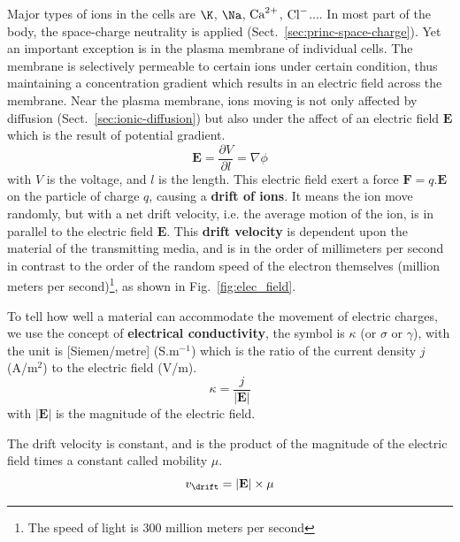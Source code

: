 Major types of ions in the cells are $\K$, $\Na$, ${\text{Ca}^{2+}}$, ${\text{Cl}^{-}}$....  In most part
of the body, the space-charge neutrality is applied
(Sect.~\ref{sec:princ-space-charge}). Yet an important exception is in the
plasma membrane of individual cells. The membrane is selectively permeable to
certain ions under certain condition, thus maintaining a concentration gradient
which results in an electric field across the membrane. Near the plasma
membrane, ions moving is not only affected by diffusion
(Sect.~\ref{sec:ionic-diffusion}) but also under the affect of an electric field
$\mathbf{E}$ which is the result of potential gradient.
\begin{equation}
  \label{eq:1368}
  \mathbf{E} = \frac{\partial V}{\partial l} = \nabla \phi
\end{equation}
with $V$ is the voltage, and $l$ is the length.  This electric field exert a
force $\mathbf{F}=q.\mathbf{E}$ on the particle of charge $q$, causing a {\bf
drift of ions}. It means the ion move randomly, but with a net drift velocity,
i.e. the average motion of the ion, is in parallel to the electric field
$\mathbf{E}$.  This {\bf drift velocity} is dependent upon the material of the
transmitting media, and is in the order of millimeters per second in contrast to
the order of the random speed of the electron themselves (million meters per
second)\footnote{The speed of light is 300 million meters per second}, as shown
in Fig.~\ref{fig:elec_field}.

To tell how well a material can accommodate the movement of electric
charges, we use the concept of {\bf electrical conductivity}, the
symbol is $\kappa$ (or $\sigma$ or $\gamma$), with the unit is
[Siemen/metre] (S.m$^{-1}$) which is the ratio of the current density $j$
(A/m$^2$) to the electric field (V/m).
\begin{equation}
  \label{eq:1367}
  \kappa = \frac{j}{|\mathbf{E}|}
\end{equation}
with $|\mathbf{E}|$ is the magnitude of the electric field. 

The drift velocity is constant, and is the product of the magnitude of
the electric field times a constant called mobility $\mu$.
\begin{equation}
  \label{eq:1369}
  v_\drift = |\mathbf{E}|\times \mu
\end{equation}

